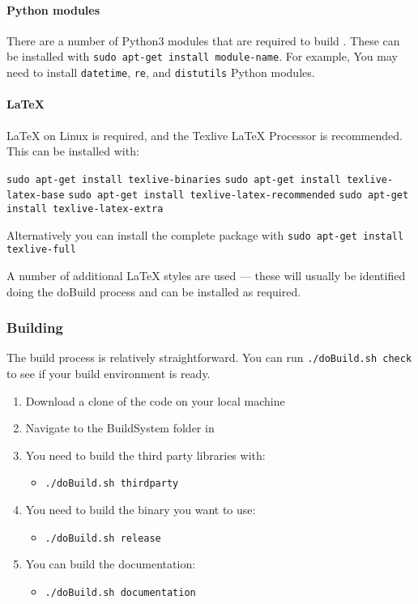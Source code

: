 \paragraph*{Python modules}

There are a number of Python3 modules that are required to build \CNAME. These can be installed with \texttt{sudo apt-get install \texttt{module-name}}. For example, You may need to install \texttt{datetime}, \texttt{re}, and \texttt{distutils} Python modules. 

\paragraph*{LaTeX}

LaTeX on Linux is required, and the Texlive LaTeX Processor is recommended. This can be installed with:

\texttt{sudo apt-get install texlive-binaries}
\texttt{sudo apt-get install texlive-latex-base}
\texttt{sudo apt-get install texlive-latex-recommended}
\texttt{sudo apt-get install texlive-latex-extra}

Alternatively you can install the complete package with 
\texttt{sudo apt-get install texlive-full}

A number of additional LaTeX styles are used --- these will usually be identified doing the doBuild process and can be installed as required. 

\subsubsection{Building \CNAME}

The build process is relatively straightforward. You can run \texttt{./doBuild.sh check} to see if your build environment is ready.

\begin{enumerate}
	\item Download a clone of the code on your local machine
	\item Navigate to the BuildSystem folder in 
	\item You need to build the third party libraries with:
	\begin{itemize}
	    \item \texttt{./doBuild.sh thirdparty}
	\end{itemize}
	\item You need to build the binary you want to use:
	\begin{itemize}
		\item \texttt{./doBuild.sh release}
	\end{itemize}
	\item You can build the documentation:
	\begin{itemize}
		\item \texttt{./doBuild.sh documentation}
	\end{itemize}
\end{enumerate}

